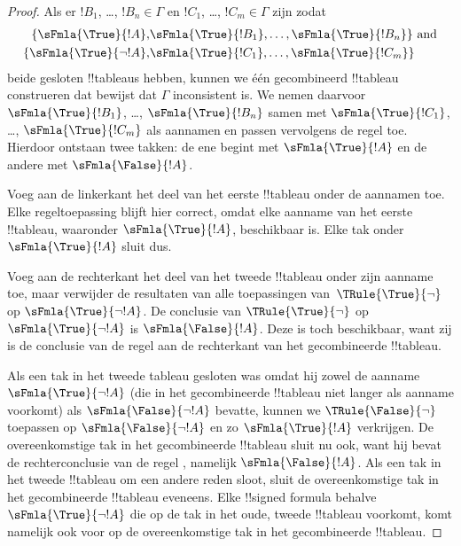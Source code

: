 \documentclass[openany]{memoir}
\begin{document}
\begin{proof}
  Als er $!B_1$, \dots, $!B_n \in \Gamma$ en $!C_1$, \dots,
  $!C_m \in \Gamma$ zijn zodat
  \begin{align*}
    \{\sFmla{\True}{!A}, &
    \sFmla{\True}{!B_1}, \dots, \sFmla{\True}{!B_n}\} \text{ and}\\
    \{\sFmla{\True}{\lnot !A}, &
    \sFmla{\True}{!C_1}, \dots, \sFmla{\True}{!C_m}\}
  \end{align*}
  beide gesloten !!{tableau}s hebben, kunnen we één gecombineerd
  !!{tableau} construeren dat bewijst dat $\Gamma$ inconsistent is.
  We nemen daarvoor $\sFmla{\True}{!B_1}$, \dots,
  $\sFmla{\True}{!B_n}$ samen met $\sFmla{\True}{!C_1}$, \dots,
  $\sFmla{\True}{!C_m}$ als aannamen en passen vervolgens de regel
  \Cut{} toe. Hierdoor ontstaan twee takken: de ene begint met
  $\sFmla{\True}{!A}$ en de andere met $\sFmla{\False}{!A}$.  
  
  Voeg aan de linkerkant het deel van het eerste !!{tableau} onder de
  aannamen toe. Elke regeltoepassing blijft hier correct, omdat elke
  aanname van het eerste !!{tableau}, waaronder
  $\sFmla{\True}{!A}$, beschikbaar is. Elke tak onder
  $\sFmla{\True}{!A}$ sluit dus. 
  
  Voeg aan de rechterkant het deel van het tweede !!{tableau} onder
  zijn aanname toe, maar verwijder de resultaten van alle toepassingen
  van~$\TRule{\True}{\lnot}$ op $\sFmla{\True}{\lnot !A}$. De conclusie
  van $\TRule{\True}{\lnot}$ op $\sFmla{\True}{\lnot !A}$ is
  $\sFmla{\False}{!A}$. Deze is toch beschikbaar, want zij is de
  conclusie van de regel \Cut{} aan de rechterkant van het
  gecombineerde !!{tableau}.

  Als een tak in het tweede tableau gesloten was omdat hij zowel de
  aanname $\sFmla{\True}{\lnot !A}$ (die in het gecombineerde
  !!{tableau} niet langer als aanname voorkomt) als
  $\sFmla{\False}{\lnot !A}$ bevatte, kunnen we
  $\TRule{\False}{\lnot}$ toepassen op
  $\sFmla{\False}{\lnot !A}$ en zo $\sFmla{\True}{!A}$ verkrijgen. De
  overeenkomstige tak in het gecombineerde !!{tableau} sluit nu ook,
  want hij bevat de rechterconclusie van de regel \Cut{}, namelijk
  $\sFmla{\False}{!A}$. Als een tak in het tweede !!{tableau} om een
  andere reden sloot, sluit de overeenkomstige tak in het gecombineerde
  !!{tableau} eveneens. Elke !!{signed formula} behalve
  $\sFmla{\True}{\lnot !A}$ die op de tak in het oude, tweede
  !!{tableau} voorkomt, komt namelijk ook voor op de overeenkomstige tak
  in het gecombineerde !!{tableau}.
  \end{proof}
\endgroup
\end{document}

